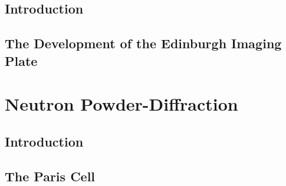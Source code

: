 \subsection{Introduction}

\subsection{The Development of the Edinburgh Imaging Plate}

\section{Neutron Powder-Diffraction}

\subsection{Introduction}

\subsection{The Paris Cell}


